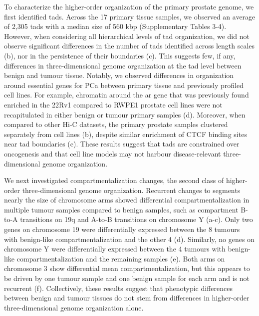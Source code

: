 To characterize the higher-order organization of the primary prostate genome, we first identified \glspl{tad}.
Across the 17 primary tissue samples, we observed an average of 2,305 \glspl{tad} with a median size of 560 kbp (Supplementary Tables 3-4).
However, when considering all hierarchical levels of \gls{tad} organization, we did not observe significant differences in the number of \glspl{tad} identified across length scales (b), nor in the persistence of their boundaries (c).
This suggests few, if any, differences in three-dimensional genome organization at the \gls{tad} level between benign and tumour tissue.
Notably, we observed differences in organization around essential genes for PCa between primary tissue and previously profiled cell lines.
For example, chromatin around the \gls{ar} gene that was previously found enriched in the 22Rv1 compared to RWPE1 prostate cell lines \cite{rhieHighresolution3DEpigenomic2019} were not recapitulated in either benign or tumour primary samples (d).
Moreover, when compared to other Hi-C datasets, the primary prostate samples clustered separately from cell lines (b), despite similar enrichment of CTCF binding sites near \gls{tad} boundaries (c).
These results suggest that \glspl{tad} are constrained over oncogenesis and that cell line models may not harbour disease-relevant three-dimensional genome organization.

We next investigated compartmentalization changes, the second class of higher-order three-dimensional genome organization.
Recurrent changes to segments nearly the size of chromosome arms showed differential compartmentalization in multiple tumour samples compared to benign samples, such as compartment B-to-A transitions on 19q and A-to-B transitions on chromosome Y (a-c).
Only two genes on chromosome 19 were differentially expressed between the 8 tumours with benign-like compartmentalization and the other 4 (d).
Similarly, no genes on chromosome Y were differentially expressed between the 4 tumours with benign-like compartmentalization and the remaining samples (e).
Both arms on chromosome 3 show differential mean compartmentalization, but this appears to be driven by one tumour sample and one benign sample for each arm and is not recurrent (f).
Collectively, these results suggest that phenotypic differences between benign and tumour tissues do not stem from differences in higher-order three-dimensional genome organization alone.

